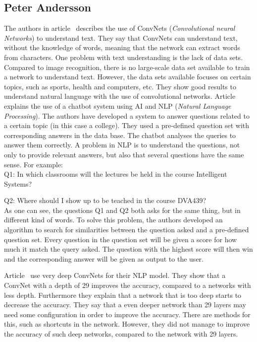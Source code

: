 \subsection{Peter Andersson}
The authors in article~\cite{DBLP:journals/corr/ZhangL15} describes the use of ConvNets (\textit{Convolutional neural Networks}) to understand text. They say that ConvNets can understand text, without the knowledge of words, meaning that the network can extract words from characters. One problem with text understanding is the lack of data sets. Compared to image recognition, there is no large-scale data set available to train a network to understand text. However, the data sets available focuses on certain topics, such as sports, health and computers, etc. They show good results to understand natural language with the use of convolutional networks.
\newline
Article~\cite{lalwani2018implementation} explains the use of a chatbot system using AI and NLP (\textit{Natural Language Processing}). The authors have developed a system to answer questions related to a certain topic (in this case a college). They used a pre-defined question set with corresponding answers in the data base. The chatbot analyses the queries to answer them correctly. A problem in NLP is to understand the questions, not only to provide relevant answers, but also that several questions have the same sense. For example:\\

Q1: In which classrooms will the lectures be held in the course Intelligent Systems?

Q2: Where should I show up to be teached in the course DVA439?\\

As one can see, the questions Q1 and Q2 both asks for the same thing, but in different kind of words. To solve this problem, the authors developed an algorithm to search for similarities between the question asked and a pre-defined question set. Every question in the question set will be given a score for how much it match the query asked. The question with the highest score will then win and the corresponding answer will be given as output to the user.

Article~\cite{conneau2016very} use very deep ConvNets for their NLP model. They show that a ConvNet with a depth of 29 improves the accuracy, compared to a networks with less depth. Furthermore they explain that a network that is too deep starts to decrease the accuracy. They say that a even deeper network than 29 layers may need some configuration in order to improve the accuracy. There are methods for this, such as shortcuts in the network. However, they did not manage to improve the accuracy of such deep networks, compared to the network with 29 layers.

